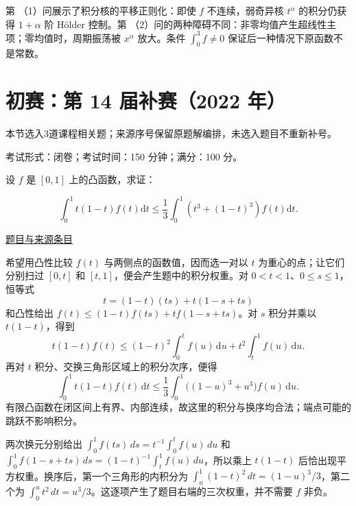 \documentclass[12pt,fontset=fandol]{ctexart}
\begin{document}
\begin{remark}[方法与条件]第 （1）问展示了积分核的平移正则化：即使 $f$ 不连续，弱奇异核 $t^\alpha$ 的积分仍获得 $1+\alpha$ 阶 Hölder 控制。第 （2）问的两种障碍不同：非零均值产生超线性主项；零均值时，周期振荡被 $x^\alpha$ 放大。条件 $\int_0^3f\neq0$ 保证后一种情况下原函数不是常数。\end{remark}

\section{初赛：第 14 届补赛（2022 年）}

本节选入3道课程相关题；来源序号保留原题解编排，未选入题目不重新补号。

\begin{remark}[来源说明]考试形式：闭卷；考试时间：150 分钟；满分：100 分。\end{remark}

\begin{example}[来源序号2]\label{ex:ch05-14th-A-makeup:2}\label{pr:ch05-14th-A-makeup:2}

设 $f$ 是 $[0,1]$ 上的凸函数，求证：

\[
\int_0^1 t(1-t)f(t) \mathrm{d}t \leq \frac{1}{3} \int_0^1 \left(t^3+(1-t)^3\right)f(t) \mathrm{d}t.
\]

\par\href{https://github.com/lzxcr/cmc-mathematics/blob/64916fa1fdbc3e444a652eca204d5669058ee321/src/problems/preliminary/14-makeup/02.md}{题目与来源条目}

\end{example}

\begin{solve}\label{ans:ch05-14th-A-makeup:2}

希望用凸性比较 $f(t)$ 与两侧点的函数值，因而选一对以 $t$ 为重心的点；让它们分别扫过 $[0,t]$ 和 $[t,1]$，便会产生题中的积分权重。对 $0<t<1$、$0\leq s\leq1$，恒等式
\[
t=(1-t)(ts)+t(1-s+ts)
\]
和凸性给出 $f(t)\leq(1-t)f(ts)+tf(1-s+ts)$。对 $s$ 积分并乘以 $t(1-t)$，得到
\[
t(1-t)f(t)\leq(1-t)^2\int_0^t f(u)\,\mathrm du
+t^2\int_t^1f(u)\,\mathrm du.
\]
再对 $t$ 积分、交换三角形区域上的积分次序，便得
\[
\int_0^1t(1-t)f(t)\,\mathrm dt
\leq\frac13\int_0^1\bigl((1-u)^3+u^3\bigr)f(u)\,\mathrm du.
\]
有限凸函数在闭区间上有界、内部连续，故这里的积分与换序均合法；端点可能的跳跃不影响积分。

两次换元分别给出 $\int_0^1f(ts)\,ds=t^{-1}\int_0^tf(u)\,du$ 和 $\int_0^1f(1-s+ts)\,ds=(1-t)^{-1}\int_t^1f(u)\,du$，所以乘上 $t(1-t)$ 后恰出现平方权重。换序后，第一个三角形的内积分为 $\int_u^1(1-t)^2\,dt=(1-u)^3/3$，第二个为 $\int_0^ut^2\,dt=u^3/3$。这逐项产生了题目右端的三次权重，并不需要 $f$ 非负。

\end{solve}
\end{document}
